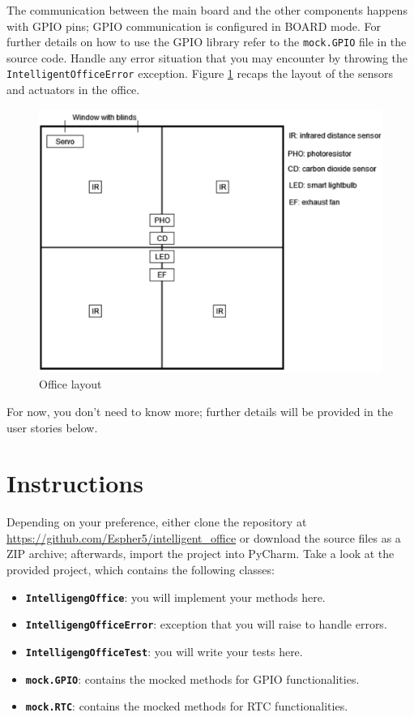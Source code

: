 The communication between the main board and the other components happens with GPIO pins; GPIO communication is configured in BOARD mode. For further details on how to use the GPIO library refer to the \texttt{mock.GPIO} file in the source code.
Handle any error situation that you may encounter by throwing the \texttt{IntelligentOfficeError} exception.
Figure \ref{office_layout} recaps the layout of the sensors and actuators in the office.

\begin{figure}[H]
    \centering
    \includegraphics[width=\linewidth]{figures/appendix/intelligent_office.png}
    \caption{Office layout}
    \label{office_layout}
\end{figure}

For now, you don't need to know more; further details will be provided in the user stories below.

\section{Instructions}
Depending on your preference, either clone the repository at \url{https://github.com/Espher5/intelligent_office} or download the source files as a ZIP archive; afterwards, import the project into PyCharm. 
Take a look at the provided project, which contains the following classes: 
\begin{itemize}
    \item \textbf{\texttt{IntelligengOffice}}: you will implement your methods here.
    \item \textbf{\texttt{IntelligengOfficeError}}: exception that you will raise to handle errors.
    \item \textbf{\texttt{IntelligengOfficeTest}}: you will write your tests here.
    \item \textbf{\texttt{mock.GPIO}}: contains the mocked methods for GPIO functionalities.
    \item \textbf{\texttt{mock.RTC}}: contains the mocked methods for RTC functionalities.
\end{itemize}

